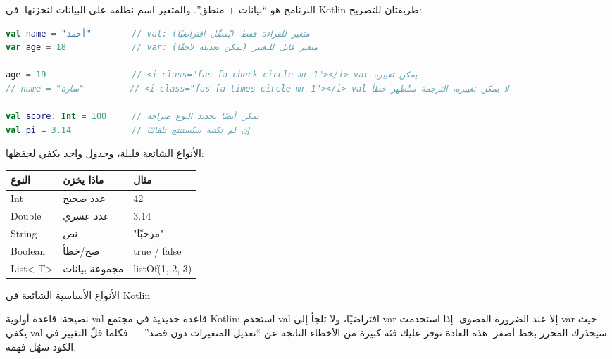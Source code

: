 


البرنامج هو “بيانات + منطق”. والمتغير اسم نطلقه على البيانات لنخزنها. في Kotlin طريقتان للتصريح:

\begin{lstlisting}[language=Kotlin]
val name = "أحمد"        // val: متغير للقراءة فقط (يُفضَّل افتراضيًا)
var age = 18             // var: متغير قابل للتغيير (يمكن تعديله لاحقًا)

age = 19                 // <i class="fas fa-check-circle mr-1"></i> var يمكن تغييره
// name = "سارة"         // <i class="fas fa-times-circle mr-1"></i> val لا يمكن تغييره، الترجمة ستُظهر خطأ

val score: Int = 100     // يمكن أيضًا تحديد النوع صراحة
val pi = 3.14            // إن لم تكتبه سيُستنتج تلقائيًا
\end{lstlisting}

الأنواع الشائعة قليلة، وجدول واحد يكفي لحفظها:

\begin{center}
\begin{tabularx}{\linewidth}{|X|X|X|}
\hline
\textbf{النوع} & \textbf{ماذا يخزن} & \textbf{مثال} \tabularnewline
\hline
Int & عدد صحيح & 42 \tabularnewline
Double & عدد عشري & 3.14 \tabularnewline
String & نص & "مرحبًا" \tabularnewline
Boolean & صح/خطأ & true / false \tabularnewline
List< T> & مجموعة بيانات & listOf(1, 2, 3) \tabularnewline
\hline
\end{tabularx}
\end{center}

\begin{center}\small\color{gray}الأنواع الأساسية الشائعة في Kotlin\end{center}

\begin{tcbinfo}{نصيحة: قاعدة أولوية val}
قاعدة حديدية في مجتمع Kotlin: استخدم val افتراضيًا، ولا تلجأ إلى var إلا عند الضرورة القصوى. إذا استخدمت var حيث يكفي val سيحذرك المحرر بخط أصفر. هذه العادة توفر عليك فئة كبيرة من الأخطاء الناتجة عن “تعديل المتغيرات دون قصد” — فكلما قلّ التغيير في الكود سهُل فهمه.

\end{tcbinfo}

